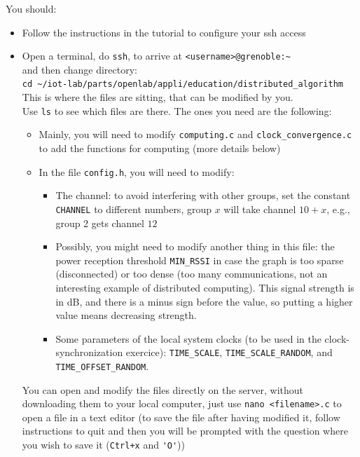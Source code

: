 \documentclass{article}
\begin{document}
You should:
\begin{itemize}
\item Follow the instructions in the tutorial to configure your ssh access
\item Open a  terminal, do \verb=ssh=, to arrive at \verb=<username>@grenoble:~= \\
and then change directory:\\
\verb=cd ~/iot-lab/parts/openlab/appli/education/distributed_algorithm= \\
This is where the files are sitting, that can be modified by you.\\

Use \verb=ls= to see which files are there. The ones you need are the following:
	\begin{itemize}
	\item Mainly, you will need to modify \verb=computing.c= and \verb=clock_convergence.c= to add the functions for computing (more details below)
	\item In the file \verb=config.h=, you will need to modify:
		\begin{itemize}

		\item The channel: to avoid interfering with other groups, set the
            constant \verb=CHANNEL= to different numbers, group $x$ will take
            channel $10+x$, e.g., group 2 gets channel $12$
		\item Possibly, you might  need to modify another thing in this file:
            the power reception threshold \verb=MIN_RSSI= in case the graph is
            too sparse (disconnected) or too dense (too many communications, not
            an interesting example of distributed computing). This signal
            strength is in dB, and there is a minus sign before the value,
            so putting a higher value means decreasing strength.
         \item Some parameters of the local system clocks (to be used in the clock-synchronization exercice): \verb=TIME_SCALE=, \verb=TIME_SCALE_RANDOM=, and \verb=TIME_OFFSET_RANDOM=.
		\end{itemize}
	\end{itemize}
You can open and modify the files directly on the server, without downloading
them to your local computer, just use \verb=nano <filename>.c= to open a file in
a text editor (to save the file after having modified it, follow instructions to
quit and then you will be prompted with the question where you wish to save it
(\verb=Ctrl+x= and \verb='O'=))


\end{itemize}
\end{document}
